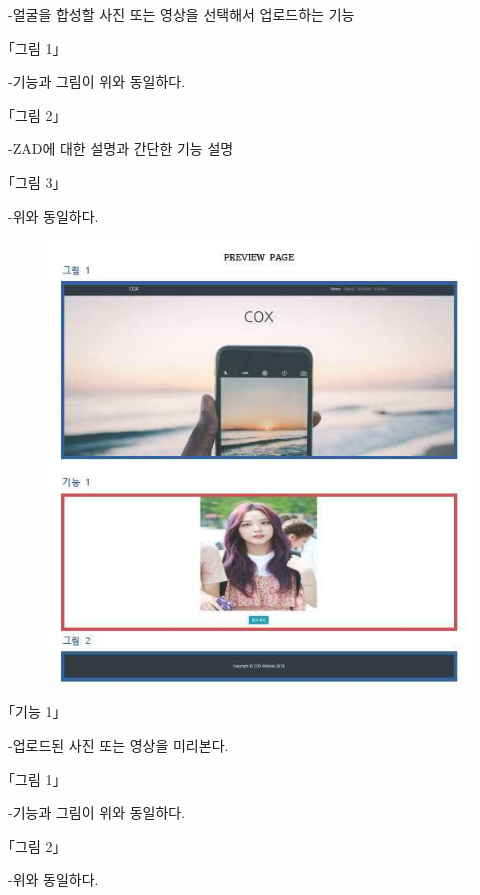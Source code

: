 \documentclass{oblivoir}
\begin{document}
-얼굴을 합성할 사진 또는 영상을 선택해서 업로드하는 기능

｢그림 1｣

-기능과 그림이 위와 동일하다.

｢그림 2｣

-ZAD에 대한 설명과 간단한 기능 설명

｢그림 3｣

-위와 동일하다.

\newpage
\begin{figure}[h!]
    \centering
    \includegraphics{pic/chp6/img939}
\end{figure}

｢기능 1｣

-업로드된 사진 또는 영상을 미리본다.

｢그림 1｣

-기능과 그림이 위와 동일하다.

｢그림 2｣

-위와 동일하다.
\end{document}
